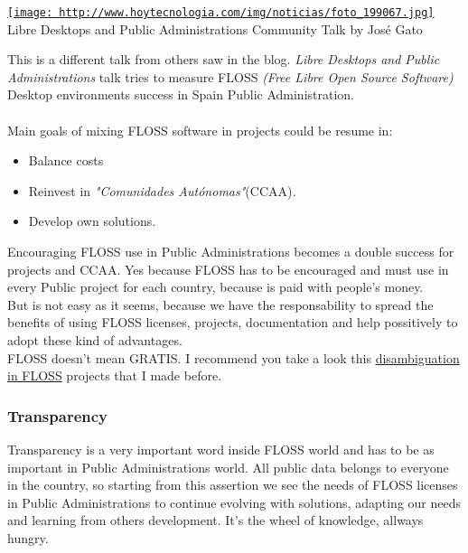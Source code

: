 
\begin{tabular}\href{http://www.hoytecnologia.com/img/noticias/foto_199067.jpg}{
\texttt{[image: http://www.hoytecnologia.com/img/noticias/foto\_199067.jpg]}} \\ 
Libre Desktops and Public Administrations Community Talk by José Gato
\end{tabular} This is a different talk from others saw in the blog. \textit{Libre Desktops and Public Administrations} talk tries to measure FLOSS \textit{(Free Libre Open Source Software)} Desktop environments success in Spain Public Administration.
\\
\\ Main goals of mixing FLOSS software in projects could be resume in:
\begin{itemize}
	\item Balance costs
	\item Reinvest in \textit{"Comunidades Autónomas"}\nolinebreak(CCAA)\textit{.}
	\item Develop own solutions.
\end{itemize} Encouraging FLOSS use in Public Administrations becomes a double success for projects and CCAA. Yes because FLOSS has to be encouraged and must use in every Public project for each country, because is paid with people's money.
\\ But is not easy as it seems, because we have the responsability to spread the benefits of using FLOSS licenses, projects, documentation and help possitively to adopt these kind of advantages.
\\ FLOSS doesn't mean GRATIS. I recommend you take a look this \href{http://mastersfwlurjc.blogspot.com.es/2012/11/errores-de-percepcion-del-software-libre.html}{disambiguation in FLOSS} projects that I made before.

\subsubsection{ Transparency} Transparency is a very important word inside FLOSS world and has to be as important in Public Administrations world. All public data belongs to everyone in the country, so starting from this assertion we see the needs of FLOSS licenses in Public Administrations to continue evolving with solutions, adapting our needs and learning from others development. It's the wheel of knowledge, allways hungry.

